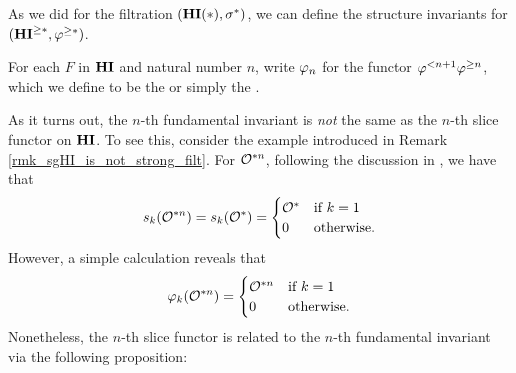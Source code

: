 As we did for the filtration $(\mathbf{HI}(*), \sigma^{*})$, we can define the 
structure invariants for $(\mathbf{HI}^{\geq *}, \varphi^{\geq *})$. 
\begin{defn}
For each $F$ in $\mathbf{HI}$ and natural number $n$, write $\varphi_{n}$ 
for the functor $\varphi^{< n + 1} \varphi^{\geq n}$, which we define to be the 
or simply the .
\end{defn}

As it turns out, the $n$-th fundamental invariant is \emph{not} 
the same as the $n$-th slice functor on $\mathbf{HI}$. To see this, 
consider the example introduced in Remark 
\ref{rmk_sgHI_is_not_strong_filt}. For $\mathcal{O}^{* n}$, following the
discussion in \loccit, we have that
\[
s_k(\mathcal{O}^{* n}) = s_k(\mathcal{O}^*) = \begin{cases}
\mathcal{O}^* &\textrm{if }k = 1\\
0   &\textrm{otherwise}.
\end{cases}
\]
However, a simple calculation reveals that
\[
\varphi_{k}(\mathcal{O}^{* n}) = \begin{cases}
\mathcal{O}^{* n} &\textrm{if }k = 1\\
0     &\textrm{otherwise}.
\end{cases}
\]
Nonetheless, the $n$-th slice functor is related to the $n$-th
fundamental invariant via the following proposition:

